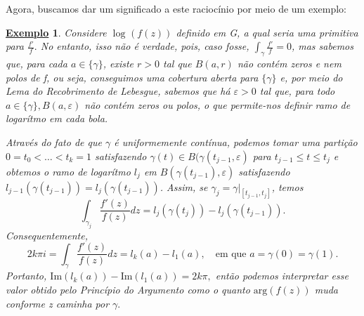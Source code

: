 \documentclass{article}
\newtheorem{example}{\underline{Exemplo}}[section]
\begin{document}
  Agora, buscamos dar um significado a este raciocínio por meio de um exemplo:
  \begin{example}
    Considere \(\log^{}{(f(z))}\) definido em G, a qual seria uma primitiva para \(\frac{f'}{f}.\) No entanto, isso não é verdade, pois, caso fosse,
    \(\int_{\gamma }^{}\frac{f'}{f} = 0\), mas sabemos que, para cada \(a\in\{\gamma \}\), existe \(r > 0\) tal que \(B(a, r)\) não contém zeros e nem polos de f, ou seja,
    conseguimos uma cobertura aberta para \(\{\gamma \}\) e, por meio do Lema do Recobrimento de Lebesgue,\footnotemark[1] sabemos que há \(\varepsilon > 0\) tal que, para todo \(a\in\{\gamma \}, B(a, \varepsilon )\) não
    contém zeros ou polos, o que permite-nos definir ramo de logarítmo em cada bola.

    Através do fato de que \(\gamma \) é uniformemente contínua, podemos tomar uma partição \(0 = t_{0} < \dotsc < t_{k} = 1\) satisfazendo \(\gamma (t)\in B(\gamma (t_{j-1}, \varepsilon )\) para \(t_{j-1}\leq t\leq t_{j}\) e obtemos o ramo de logarítmo
    \(l_{j}\) em \(B(\gamma (t_{j-1}), \varepsilon )\) satisfazendo \(l_{j-1}(\gamma (t_{j-1})) = l_{j}(\gamma (t_{j-1}))\). Assim, se \(\gamma_{j} = \gamma|_[t_{j-1}, t_{j}]\), temos 
    \[
      \int_{\gamma_{j}}^{}\frac{f'(z)}{f(z)}dz = l_{j}(\gamma(t_{j})) - l_{j}(\gamma(t_{j-1})).
    \]
    Consequentemente,
    \[
      2k\pi i = \int_{\gamma }^{}\frac{f'(z)}{f(z)}dz = l_{k}(a) - l_{1}(a),\quad \text{em que }a=\gamma (0)=\gamma (1).
    \]
    Portanto, \(\mathrm{Im}(l_{k}(a)) - \mathrm{Im}(l_{1}(a)) = 2k\pi ,\) então podemos interpretar esse valor obtido pelo Princípio do Argumento como o quanto \(\mathrm{arg}(f(z))\) muda
    conforme z caminha por \(\gamma .\)
  \end{example}
\end{document}

